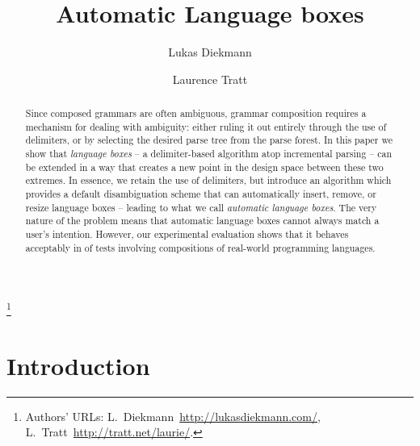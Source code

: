 \documentclass[sigplan,screen]{acmart}\settopmatter{printfolios=true,printccs=false,printacmref=false}
\begin{document}
\title{Automatic Language boxes}

\author{Lukas Diekmann}
\author{Laurence Tratt}
\thanks{Authors' URLs: %
    L.~Diekmann~\url{http://lukasdiekmann.com/},
    L.~Tratt~\url{http://tratt.net/laurie/}.
}


\begin{abstract}
Since composed grammars are often ambiguous, grammar composition requires a
mechanism for dealing with ambiguity: either ruling it out entirely through the use of
delimiters, or by selecting the desired parse tree from the parse forest.  In
this paper we show that \emph{language boxes} -- a delimiter-based
algorithm atop incremental parsing -- can be extended in a way that creates
a new point in the design space between these two extremes. In essence, we
retain the use of delimiters, but
introduce an algorithm which provides a default disambiguation scheme that
can automatically insert, remove, or resize
language boxes -- leading to what we call \emph{automatic language
boxes}. The very nature of the problem means that automatic language boxes
cannot always match a user's intention. However, our experimental
evaluation shows that it behaves acceptably in \validalloverall of
tests involving compositions of real-world programming languages.
\end{abstract}


\maketitle

\section{Introduction}
\end{document}
